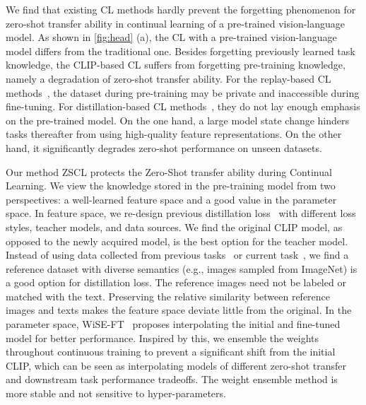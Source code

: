 We find that existing CL methods hardly prevent the forgetting phenomenon for zero-shot transfer ability in continual learning of a pre-trained vision-language model. As shown in \cref{fig:head} (a), the CL with a pre-trained vision-language model differs from the traditional one. Besides forgetting previously learned task knowledge, the CLIP-based CL suffers from forgetting pre-training knowledge, namely a degradation of zero-shot transfer ability. For the replay-based CL methods~\cite{rebuffi2017icarl,shin2017continual,lopez2017gradient,isele2018selective,lavda2018continual,prabhu2020gdumb}, the dataset during pre-training may be private and inaccessible during fine-tuning. For distillation-based CL methods~\cite{li2017learning,dhar2019learning,douillard2020podnet,ding2022don}, they do not lay enough emphasis on the pre-trained model. On the one hand, a large model state change hinders tasks thereafter from using high-quality feature representations. On the other hand, it significantly degrades zero-shot performance on unseen datasets.

Our method ZSCL protects the Zero-Shot transfer ability during Continual Learning. We view the knowledge stored in the pre-training model from two perspectives: a well-learned feature space and a good value in the parameter space. In feature space, we re-design previous distillation loss~\cite{hinton2015distilling, rebuffi2017icarl} with different loss styles, teacher models, and data sources. We find the original CLIP model, as opposed to the newly acquired model, is the best option for the teacher model. Instead of using data collected from previous tasks~\cite{rebuffi2017icarl} or current task~\cite{hinton2015distilling}, we find a reference dataset with diverse semantics (e.g., images sampled from ImageNet) is a good option for distillation loss. The reference images need not be labeled or matched with the text. Preserving the relative similarity between reference images and texts makes the feature space deviate little from the original. In the parameter space, WiSE-FT~\cite{wortsman2022robust} proposes interpolating the initial and fine-tuned model for better performance. Inspired by this, we ensemble the weights throughout continuous training to prevent a significant shift from the initial CLIP, which can be seen as interpolating models of different zero-shot transfer and downstream task performance tradeoffs. The weight ensemble method is more stable and not sensitive to hyper-parameters.

